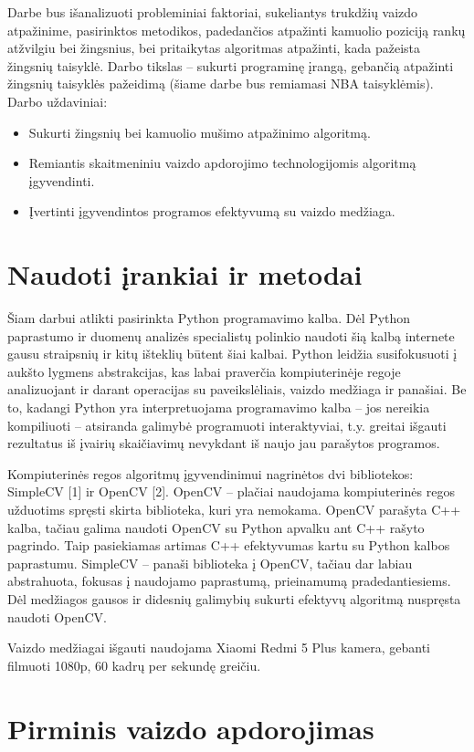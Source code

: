 \documentclass{VUMIFPSkursinis}
\begin{document}
Darbe bus išanalizuoti probleminiai faktoriai, sukeliantys trukdžių vaizdo atpažinime, pasirinktos metodikos, padedančios atpažinti kamuolio poziciją rankų atžvilgiu bei žingsnius, bei pritaikytas algoritmas atpažinti, kada pažeista žingsnių taisyklė. Darbo tikslas – sukurti programinę įrangą, gebančią atpažinti žingsnių taisyklės pažeidimą (šiame darbe bus remiamasi NBA taisyklėmis). Darbo uždaviniai:
\begin{itemize}
 \item Sukurti žingsnių bei kamuolio mušimo atpažinimo algoritmą.
 \item Remiantis skaitmeniniu vaizdo apdorojimo technologijomis algoritmą įgyvendinti.
 \item Įvertinti įgyvendintos programos efektyvumą su vaizdo medžiaga.
\end{itemize}

\section{Naudoti įrankiai ir metodai}
Šiam darbui atlikti pasirinkta Python programavimo kalba. Dėl Python paprastumo ir duomenų analizės specialistų polinkio naudoti šią kalbą internete gausu straipsnių ir kitų išteklių būtent šiai kalbai. Python leidžia susifokusuoti į aukšto lygmens abstrakcijas, kas labai praverčia kompiuterinėje regoje analizuojant ir darant operacijas su paveikslėliais, vaizdo medžiaga ir panašiai. Be to, kadangi Python yra interpretuojama programavimo kalba – jos nereikia kompiliuoti – atsiranda galimybė programuoti interaktyviai, t.y. greitai išgauti rezultatus iš įvairių skaičiavimų nevykdant iš naujo jau parašytos programos. 

Kompiuterinės regos algoritmų įgyvendinimui nagrinėtos dvi bibliotekos: SimpleCV [1] ir OpenCV [2]. OpenCV – plačiai naudojama kompiuterinės regos užduotims spręsti skirta biblioteka, kuri yra nemokama. OpenCV parašyta C++ kalba, tačiau galima naudoti OpenCV su  Python apvalku ant C++ rašyto pagrindo. Taip pasiekiamas artimas C++ efektyvumas kartu su Python kalbos paprastumu.
SimpleCV – panaši biblioteka į OpenCV, tačiau dar labiau abstrahuota, fokusas į naudojamo paprastumą, prieinamumą pradedantiesiems. Dėl medžiagos gausos ir didesnių galimybių sukurti efektyvų algoritmą nuspręsta naudoti OpenCV.

Vaizdo medžiagai išgauti naudojama Xiaomi Redmi 5 Plus kamera, gebanti filmuoti 1080p, 60 kadrų per sekundę greičiu. 
\section{Pirminis vaizdo apdorojimas}
\end{document}
